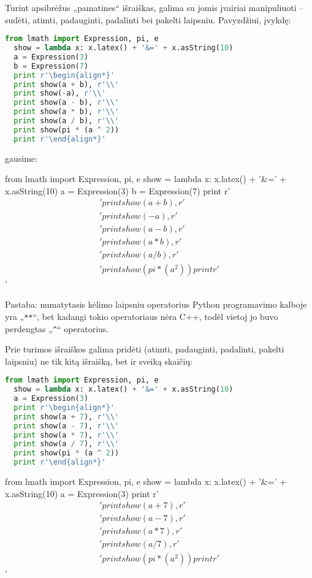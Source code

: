 Turint apsibrėžus „pamatines“ išraiškas, galima su jomis įvairiai 
manipuliuoti – sudėti, atimti, padauginti, padalinti bei pakelti
laipsniu. Pavyzdžiui, įvykdę:
\begin{lstlisting}[language=python]
  from lmath import Expression, pi, e
  show = lambda x: x.latex() + '&=' + x.asString(10)
  a = Expression(3)
  b = Expression(7)
  print r'\begin{align*}'
  print show(a + b), r'\\'
  print show(-a), r'\\'
  print show(a - b), r'\\'
  print show(a * b), r'\\'
  print show(a / b), r'\\'
  print show(pi * (a ^ 2))    
  print r'\end{align*}'
\end{lstlisting}
gausime:
\begin{python}%
from lmath import Expression, pi, e
show = lambda x: x.latex() + '&=' + x.asString(10)
a = Expression(3)
b = Expression(7)
print r'\begin{align*}'
print show(a + b), r'\\'
print show(-a), r'\\'
print show(a - b), r'\\'
print show(a * b), r'\\'
print show(a / b), r'\\'
print show(pi * (a ^ 2))
print r'\end{align*}'
\end{python}

Pastaba: numatytasis kėlimo laipsniu operatorius Python programavimo kalboje
yra „\verb|**|“, bet kadangi tokio operatoriaus nėra C++, todėl vietoj jo 
buvo perdengtas „\verb|^|“ operatorius.

Prie turimos išraiškos galima pridėti (atimti, padauginti, padalinti, 
pakelti laipsniu) ne tik kitą išraišką, bet ir sveiką skaičių:
\begin{lstlisting}[language=python]
  from lmath import Expression, pi, e
  show = lambda x: x.latex() + '&=' + x.asString(10)
  a = Expression(3)
  print r'\begin{align*}'
  print show(a + 7), r'\\'
  print show(a - 7), r'\\'
  print show(a * 7), r'\\'
  print show(a / 7), r'\\'
  print show(pi * (a ^ 2))
  print r'\end{align*}'
\end{lstlisting}
\begin{python}%
from lmath import Expression, pi, e
show = lambda x: x.latex() + '&=' + x.asString(10)
a = Expression(3)
print r'\begin{align*}'
print show(a + 7), r'\\'
print show(a - 7), r'\\'
print show(a * 7), r'\\'
print show(a / 7), r'\\'
print show(pi * (a ^ 2))
print r'\end{align*}'
\end{python}


